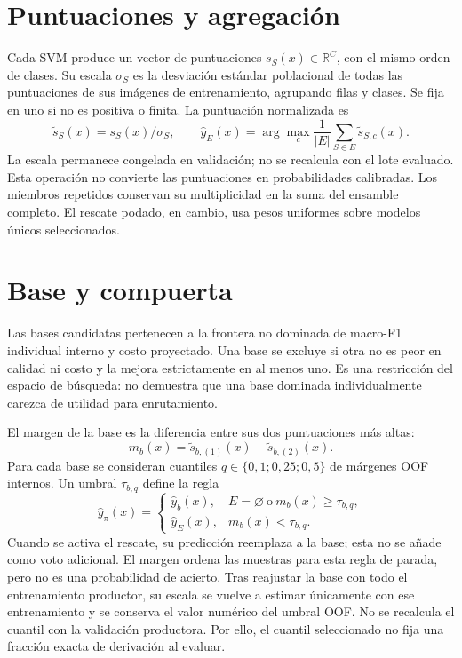 \section{Puntuaciones y agregación}
Cada SVM produce un vector de puntuaciones $s_S(x)\in\mathbb R^C$, con el mismo orden de clases. Su escala $\sigma_S$ es la desviación estándar poblacional de todas las puntuaciones de sus imágenes de entrenamiento, agrupando filas y clases. Se fija en uno si no es positiva o finita. La puntuación normalizada es
\begin{equation}
\widetilde s_S(x)=s_S(x)/\sigma_S,\qquad
\widehat y_E(x)=\arg\max_c\frac{1}{|E|}
\sum_{S\in E}\widetilde s_{S,c}(x).
\label{eq:ensemble}
\end{equation}
La escala permanece congelada en validación; no se recalcula con el lote evaluado. Esta operación no convierte las puntuaciones en probabilidades calibradas. Los miembros repetidos conservan su multiplicidad en la suma del ensamble completo. El rescate podado, en cambio, usa pesos uniformes sobre modelos únicos seleccionados.

\section{Base y compuerta}
Las bases candidatas pertenecen a la frontera no dominada de macro-F1 individual interno y costo proyectado. Una base se excluye si otra no es peor en calidad ni costo y la mejora estrictamente en al menos uno. Es una restricción del espacio de búsqueda: no demuestra que una base dominada individualmente carezca de utilidad para enrutamiento.

El margen de la base es la diferencia entre sus dos puntuaciones más altas:
\begin{equation}
m_b(x)=\widetilde s_{b,(1)}(x)-\widetilde s_{b,(2)}(x).
\label{eq:margin}
\end{equation}
Para cada base se consideran cuantiles $q\in\{0{,}1;0{,}25;0{,}5\}$ de márgenes OOF internos. Un umbral $\tau_{b,q}$ define la regla
\begin{equation}
\widehat y_\pi(x)=
\begin{cases}
\widehat y_b(x),& E=\varnothing\ \text{o}\ m_b(x)\ge\tau_{b,q},\\
\widehat y_E(x),& m_b(x)<\tau_{b,q}.
\end{cases}
\label{eq:decision-rule}
\end{equation}
Cuando se activa el rescate, su predicción reemplaza a la base; esta no se añade como voto adicional. El margen ordena las muestras para esta regla de parada, pero no es una probabilidad de acierto. Tras reajustar la base con todo el entrenamiento productor, su escala se vuelve a estimar únicamente con ese entrenamiento y se conserva el valor numérico del umbral OOF. No se recalcula el cuantil con la validación productora. Por ello, el cuantil seleccionado no fija una fracción exacta de derivación al evaluar.


